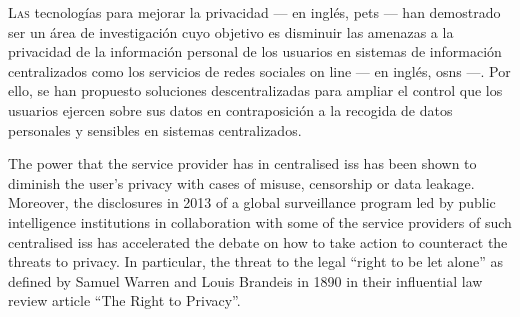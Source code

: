


    
    {
    \lettrine{\textcolor[gray]{.25}{L}}{as} tecnologías para mejorar la privacidad 
    --- en inglés, \aclp*{pet} --- han demostrado ser un área de investigación cuyo 
    objetivo es disminuir las amenazas a la privacidad de la información personal 
    de los usuarios en sistemas de información centralizados como los servicios 
    de redes sociales on line --- en inglés, \aclp*{osn} ---. Por ello, se han propuesto 
    soluciones descentralizadas para ampliar el control que los usuarios ejercen 
    sobre sus datos en contraposición a la recogida de datos personales y sensibles 
    en sistemas centralizados.\par
    }
    
    The power that the service provider has in centralised \aclp*{is} has been shown 
    to diminish the user's privacy with cases of misuse, censorship or data leakage. 
    Moreover, the disclosures in 2013 of a global surveillance program led by public 
    intelligence institutions in collaboration with some of the service providers 
    of such centralised \aclp*{is} has accelerated the debate on how to take action 
    to counteract the threats to privacy. In particular, the threat to the legal 
    ``right to be let alone'' as defined by Samuel Warren and Louis Brandeis in 
    1890 in their influential law review article ``The Right to Privacy''.
    
